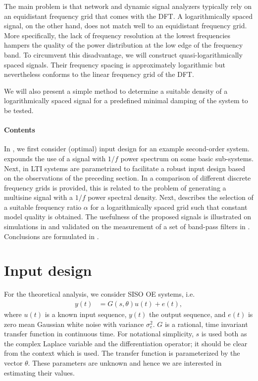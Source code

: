   The main problem is that network and dynamic signal analyzers typically
  rely on an equidistant frequency grid that comes with the \gls{DFT}.
  A logarithmically spaced signal, on the other hand, does not match well to an equidistant frequency grid.
  More specifically, the lack of frequency resolution at the lowest frequencies hampers the quality of the power distribution at the low edge of the frequency band.
  To circumvent this disadvantage, we will construct quasi-logarithmically spaced signals.
  Their frequency spacing is approximately logarithmic but nevertheless conforms to the linear frequency grid of the \gls{DFT}.

  We will also present a simple method to determine a suitable density of a logarithmically spaced signal for a predefined minimal damping of the system to be tested.

  \paragraph{Contents}
  In , we first consider (optimal) input design for an example second-order system.
   expounds the use of a signal with $1/f$  power spectrum on some basic sub-systems.
  Next, in  \gls{LTI} systems are parametrized to facilitate a robust input design based on the observations of the preceding section.
  In  a comparison of different discrete frequency grids is provided, this is related to the problem of generating a multisine signal with a $1/f$ power spectral density.
  Next,  describes the selection of a suitable frequency ratio $\alpha$ for a logarithmically spaced grid such that constant model quality is obtained.
  The usefulness of the proposed signals is illustrated on simulations in  and validated on the measurement of a set of band-pass filters in .
  Conclusions are formulated in .

\section{Input design}
\label{sec:excitation:inputDesign}
For the theoretical analysis, we consider \gls{SISO} \gls{OE} systems, i.e.
\begin{align}
y(t) &=G(s,\theta)u(t)  + e(t),
\end{align}
where $u(t)$ is a known input sequence, $y(t)$ the output sequence, and $e(t)$ is zero mean Gaussian white noise with variance $\sigma_{e}^2$.
$G$ is a rational, time invariant transfer function in continuous time.
For notational simplicity, $s$ is used both as the complex Laplace variable and the differentiation operator; it should be clear from the context which is used. 
The transfer function is parameterized by the vector $\theta$.
These parameters are unknown and hence we are interested in estimating their values. 

